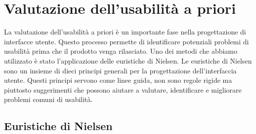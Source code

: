 \section{Valutazione dell'usabilità a priori}
La valutazione dell'usabilità a priori è un importante fase nella progettazione di interfacce utente. Questo processo permette di identificare potenziali problemi di usabilità prima che il prodotto venga rilasciato.\meskip
Uno dei metodi che abbiamo utilizzato è stato l'applicazione delle euristiche di Nielsen.\sskip
Le euristiche di Nielsen sono un insieme di dieci principi generali per la progettazione dell'interfaccia utente. Questi principi servono come linee guida, non sono regole rigide ma piuttosto suggerimenti che possono aiutare a valutare, identificare e migliorare problemi comuni di usabilità.

\subsection{Euristiche di Nielsen}

